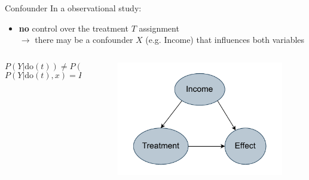 \documentclass[10pt]{beamer}
\begin{document}
\begin{frame}{Confounder}
  In a observational study:
  \begin{itemize}
    \item \textbf{no} control over the treatment $T$ assignment\\
    $\rightarrow$ there may be a confounder $X$ (e.g. Income) that influences both variables
  \end{itemize}
  \begin{columns}
    \begin{column}{0.5\textwidth}
      \begin{equation*}
        P(Y|\text{do}(t))\ne P(Y|t)
      \end{equation*}
      \begin{equation*}
        P(Y|\text{do}(t),x) =P(Y|t,x)
      \end{equation*}
    \end{column}
    \begin{column}{0.5\textwidth}
      \begin{figure}
        \centering
        \includegraphics[width=\textwidth]{images/unconfoundness.pdf}
      \end{figure}
    \end{column}
  \end{columns}

\end{frame}
\end{document}
